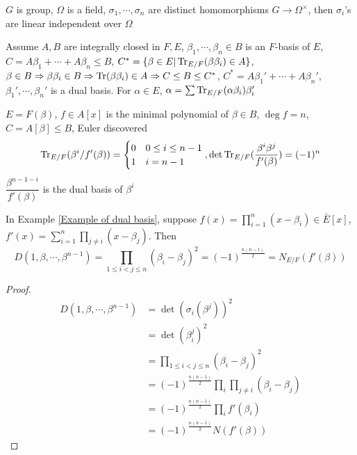 \documentclass[main]{subfiles}
\begin{document}
\begin{theorem}\label{Dedekind's theorem}
$G$ is group, $\Omega$ is a field, $\sigma_1,\cdots,\sigma_n$ are distinct homomorphisms $G\to\Omega^\times$, then $\sigma_i$'s are linear independent over $\Omega$
\end{theorem}

\begin{definition}
Assume $A,B$ are integrally closed in $F,E$, $\beta_1,\cdots,\beta_n\in B$ is an $F$-basis of $E$, $C=A\beta_1+\cdots+A\beta_n\leq B$, $C^*=\{\beta\in E|\operatorname{Tr}_{E/F}(\beta\beta_i)\in A\}$, $\beta\in B\Rightarrow\beta\beta_i\in B\Rightarrow\operatorname{Tr}(\beta\beta_i)\in A\Rightarrow C\leq B\leq C^*$, $C^*=A\beta_1'+\cdots+A\beta_n'$, $\beta_1',\cdots,\beta_n'$ is a dual basis. For $\alpha\in E$, $\alpha=\sum\operatorname{Tr}_{E/F}(\alpha\beta_i)\beta_i'$
\begin{center}
\end{center}
\end{definition}

\begin{example}\label{Example of dual basis}
$E=F(\beta)$, $f\in A[x]$ is the minimal polynomial of $\beta\in B$, $\deg f=n$, $C=A[\beta]\leq B$, Euler discovered
\[\operatorname{Tr}_{E/F}(\beta^i/f'(\beta))=\begin{cases}
0&0\leq i\leq n-1 \\
1&i=n-1
\end{cases},\det\operatorname{Tr}_{E/F}(\frac{\beta^i\beta^j}{f'(\beta)})=(-1)^n\]
$\dfrac{\beta^{n-1-i}}{f'(\beta)}$ is the dual basis of $\beta^i$
\end{example}

\begin{proposition}
In Example \ref{Example of dual basis}, suppose $f(x)=\prod_{i=1}^n(x-\beta_i)\in\bar E[x]$, $f'(x)=\sum_{i=1}^n\prod_{j\neq i}(x-\beta_j)$. Then
\[D(1,\beta,\cdots,\beta^{n-1})=\prod_{1\leq i<j\leq n}(\beta_i-\beta_j)^2=(-1)^{\frac{n(n-1)}{2}}=N_{E/F}(f'(\beta))\]
\end{proposition}

\begin{proof}
\begin{align*}
D(1,\beta,\cdots,\beta^{n-1})&=\det(\sigma_i(\beta^j))^2 \\
&=\det(\beta_i^j)^2 \\
&=\prod_{1\leq i<j\leq n}(\beta_i-\beta_j)^2 \\
&=(-1)^{\frac{n(n-1)}{2}}\prod_i\prod_{j\neq i}(\beta_i-\beta_j) \\
&=(-1)^{\frac{n(n-1)}{2}}\prod_if'(\beta_i) \\
&=(-1)^{\frac{n(n-1)}{2}}N(f'(\beta))
\end{align*}
\end{proof}
\end{document}
